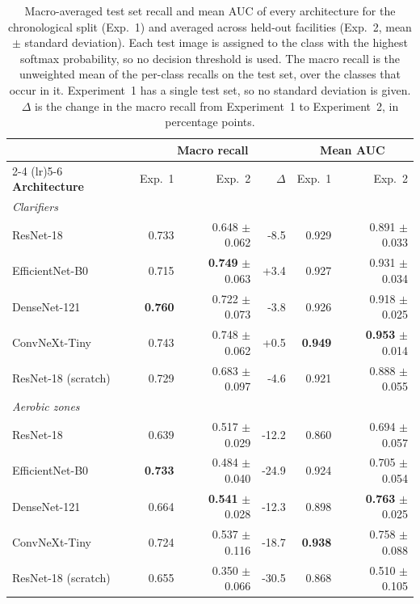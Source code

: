 \begin{table}[htbp]
\centering
\setlength{\tabcolsep}{4pt}
\caption{Macro-averaged test set recall and mean AUC of every architecture for the chronological split (Exp.~1) and averaged across held-out facilities (Exp.~2, mean $\pm$ standard deviation). Each test image is assigned to the class with the highest softmax probability, so no decision threshold is used. The macro recall is the unweighted mean of the per-class recalls on the test set, over the classes that occur in it. Experiment~1 has a single test set, so no standard deviation is given. $\Delta$ is the change in the macro recall from Experiment~1 to Experiment~2, in percentage points.}
\label{tab:res_multiclass}
\begin{tabular}{l rrr rr}
\toprule
& \multicolumn{3}{c}{\textbf{Macro recall}} & \multicolumn{2}{c}{\textbf{Mean AUC}} \\
\cmidrule(lr){2-4} \cmidrule(lr){5-6}
\textbf{Architecture} & Exp.~1 & Exp.~2 & $\Delta$ & Exp.~1 & Exp.~2 \\
\midrule
\multicolumn{6}{l}{\textit{Clarifiers}} \\
ResNet-18 & 0.733 & 0.648 $\pm$ 0.062 & -8.5 & 0.929 & 0.891 $\pm$ 0.033 \\
EfficientNet-B0 & 0.715 & \textbf{0.749} $\pm$ 0.063 & +3.4 & 0.927 & 0.931 $\pm$ 0.034 \\
DenseNet-121 & \textbf{0.760} & 0.722 $\pm$ 0.073 & -3.8 & 0.926 & 0.918 $\pm$ 0.025 \\
ConvNeXt-Tiny & 0.743 & 0.748 $\pm$ 0.062 & +0.5 & \textbf{0.949} & \textbf{0.953} $\pm$ 0.014 \\
ResNet-18 (scratch) & 0.729 & 0.683 $\pm$ 0.097 & -4.6 & 0.921 & 0.888 $\pm$ 0.055 \\
\midrule
\multicolumn{6}{l}{\textit{Aerobic zones}} \\
ResNet-18 & 0.639 & 0.517 $\pm$ 0.029 & -12.2 & 0.860 & 0.694 $\pm$ 0.057 \\
EfficientNet-B0 & \textbf{0.733} & 0.484 $\pm$ 0.040 & -24.9 & 0.924 & 0.705 $\pm$ 0.054 \\
DenseNet-121 & 0.664 & \textbf{0.541} $\pm$ 0.028 & -12.3 & 0.898 & \textbf{0.763} $\pm$ 0.025 \\
ConvNeXt-Tiny & 0.724 & 0.537 $\pm$ 0.116 & -18.7 & \textbf{0.938} & 0.758 $\pm$ 0.088 \\
ResNet-18 (scratch) & 0.655 & 0.350 $\pm$ 0.066 & -30.5 & 0.868 & 0.510 $\pm$ 0.105 \\
\bottomrule
\end{tabular}
\end{table}




